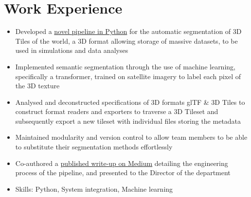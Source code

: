 \documentclass{cv}
\begin{document}
\section{Work Experience}
\begin{subsections}
    \subtitle{Simulation \& Training Systems Hub, Defence Science and Technology Agency}
    \item{}
    \begin{itemize}
        \item Developed a \href{https://github.com/thedylone/tile-segmentation-pipeline}{novel pipeline in Python} for the automatic segmentation of 3D Tiles of the world, a 3D format allowing storage of massive datasets, to be used in simulations and data analyses
        \item Implemented semantic segmentation through the use of machine learning, specifically a transformer, trained on satellite imagery to label each pixel of the 3D texture
        \item Analysed and deconstructed specifications of 3D formats glTF \& 3D Tiles to construct format readers and exporters to traverse a 3D Tileset and subsequently export a new tileset with individual files storing the metadata
        \item Maintained modularity and version control to allow team members to be able to substitute their segmentation methods effortlessly
        \item Co-authored a \href{https://medium.com/d-classified/segmentation-pipeline-for-3d-tiles-1303fcb5e6be}{published write-up on Medium} detailing the engineering process of the pipeline, and presented to the Director of the department
        \item Skills: Python, System integration, Machine learning
    \end{itemize}


\end{subsections}
\end{document}
